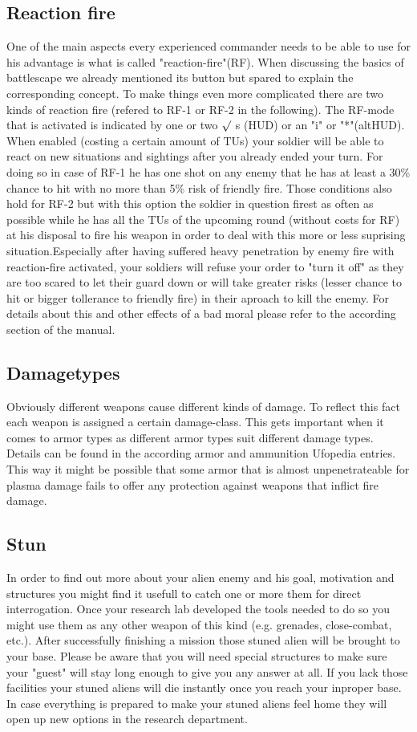 \subsection{Reaction fire}
One of the main aspects every experienced commander needs to be able to use for his advantage is what is called "reaction-fire"(RF). When discussing the basics of battlescape we already mentioned its button but spared to explain the corresponding concept. To make things even more complicated there are two kinds of reaction fire (refered to RF-1 or RF-2 in the following). The RF-mode that is activated is indicated by one or two $\surd$ s (HUD) or an "i" or "*"(altHUD). When enabled (costing a certain amount of TUs) your soldier will be able to react on new situations and sightings after you already ended your turn. For doing so in case of RF-1 he has one shot on any enemy that he has at least a 30\% chance to hit with no more than 5\% risk of friendly fire. Those conditions also hold for RF-2 but with this option the soldier in question firest as often as possible while he has all the TUs of the upcoming round (without costs for RF) at his disposal to fire his weapon in order to deal with this more or less suprising situation.Especially after having suffered heavy penetration by enemy fire with reaction-fire activated, your soldiers will refuse your order to "turn it off" as they are too scared to let their guard down or will take greater risks (lesser chance to hit or bigger tollerance to friendly fire) in their aproach to kill the enemy. For details about this and other effects of a bad moral please refer to the according section of the manual.

\subsection{Damagetypes}
Obviously different weapons cause different kinds of damage. To reflect this fact each weapon is assigned a certain damage-class. This gets important when it comes to armor types as different armor types suit different damage types. Details can be found in the according armor and ammunition Ufopedia entries. This way it might be possible that some armor that is almost unpenetrateable for plasma damage fails to offer any protection against weapons that inflict fire damage.

\subsection{Stun}
In order to find out more about your alien enemy and his goal, motivation and structures you might find it usefull to catch one or more them for direct interrogation. Once your research lab developed the tools needed to do so you might use them as any other weapon of this kind (e.g. grenades, close-combat, etc.). After successfully finishing a mission those stuned alien will be brought to your base. Please be aware that you will need special structures to make sure your "guest" will stay long enough to give you any answer at all. If you lack those facilities your stuned aliens will die instantly once you reach your inproper base. In case everything is prepared to make your stuned aliens feel home they will open up new options in the research department.

